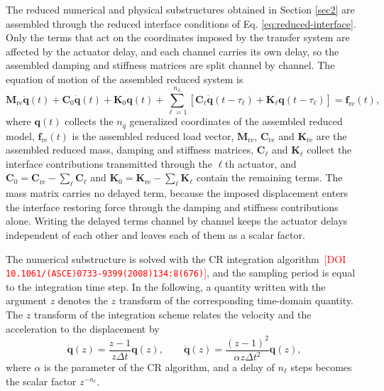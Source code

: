 \documentclass[11pt,a4paper]{article}
\numberwithin{equation}{section}
\newcommand{\rev}[1]{\textcolor{red}{#1}}
\begin{document}
The reduced numerical and physical substructures obtained in Section \ref{sec2} are assembled through the reduced interface conditions of Eq. \eqref{eq:reduced-interface}. Only the terms that act on the coordinates imposed by the transfer system are affected by the actuator delay, and each channel carries its own delay, so the assembled damping and stiffness matrices are split channel by channel. The equation of motion of the assembled reduced system is
\begin{equation}
	\mathbf{M}_{\mathrm{re}}\ddot{\bm{q}}(t)+\mathbf{C}_{0}\dot{\bm{q}}(t)+\mathbf{K}_{0}\bm{q}(t)
	+\sum_{\ell=1}^{n_{\mathrm{a}}}
	\left[
	\mathbf{C}_{\ell}\dot{\bm{q}}(t-\tau_{\ell})
	+\mathbf{K}_{\ell}\bm{q}(t-\tau_{\ell})
	\right]
	=\bm{f}_{\mathrm{re}}(t),
	\label{eq:delayed-eom}
\end{equation}
where \(\bm{q}(t)\) collects the \(n_{q}\) generalized coordinates of the assembled reduced model, \(\bm{f}_{\mathrm{re}}(t)\) is the assembled reduced load vector, \(\mathbf{M}_{\mathrm{re}}\), \(\mathbf{C}_{\mathrm{re}}\) and \(\mathbf{K}_{\mathrm{re}}\) are the assembled reduced mass, damping and stiffness matrices, \(\mathbf{C}_{\ell}\) and \(\mathbf{K}_{\ell}\) collect the interface contributions transmitted through the \(\ell\)th actuator, and \(\mathbf{C}_{0}=\mathbf{C}_{\mathrm{re}}-\sum_{\ell}\mathbf{C}_{\ell}\) and \(\mathbf{K}_{0}=\mathbf{K}_{\mathrm{re}}-\sum_{\ell}\mathbf{K}_{\ell}\) contain the remaining terms. The mass matrix carries no delayed term, because the imposed displacement enters the interface restoring force through the damping and stiffness contributions alone. Writing the delayed terms channel by channel keeps the actuator delays independent of each other and leaves each of them as a scalar factor.

The numerical substructure is solved with the CR integration algorithm \cite{ChenRicles2008b}\,\rev{[DOI \nolinkurl{10.1061/(ASCE)0733-9399(2008)134:8(676)}]}, and the sampling period is equal to the integration time step. In the following, a quantity written with the argument \(z\) denotes the \(z\) transform of the corresponding time-domain quantity. The \(z\) transform of the integration scheme relates the velocity and the acceleration to the displacement by
\begin{equation}
	\dot{\bm{q}}(z)=\frac{z-1}{z\Delta t}\bm{q}(z),
	\qquad
	\ddot{\bm{q}}(z)=\frac{(z-1)^{2}}{\alpha z\Delta t^{2}}\bm{q}(z),
	\label{eq:z-derivatives}
\end{equation}
where \(\alpha\) is the parameter of the CR algorithm, and a delay of \(n_{\ell}\) steps becomes the scalar factor \(z^{-n_{\ell}}\).
\end{document}
